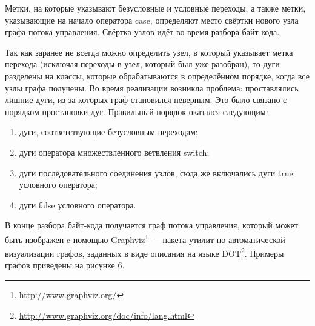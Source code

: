 \documentclass[14pt]{extarticle}
\begin{document}
Метки, на которые указывают безусловные и условные переходы, а также метки, указывающие на начало оператора case, определяют место свёртки нового узла графа потока управления. Свёртка узлов идёт во время разбора байт-кода.

Так как заранее не всегда можно определить узел, в который указывает метка перехода (исключая переходы в узел, который был уже разобран), то дуги разделены на классы, которые обрабатываются в определённом порядке, когда все узлы графа получены. Во время реализации возникла проблема: проставлялись лишние дуги, из-за которых граф становился неверным. Это было связано с порядком простановки дуг. Правильный порядок оказался следующим:
\begin{enumerate}
\item дуги, соответствующие безусловным переходам;
\item дуги оператора множествленного ветвления switch;
\item дуги последовательного соединения узлов, сюда же включались дуги true условного оператора;
\item дуги false условного оператора.
\end{enumerate}

В конце разбора байт-кода получается граф потока управления, который может быть изображен c помощью Graphviz\footnote{\url{http://www.graphviz.org/}} --- пакета утилит по автоматической визуализации графов, заданных в виде описания на языке DOT\footnote{\url{http://www.graphviz.org/doc/info/lang.html}}.
Примеры графов приведены на рисунке 6.
\end{document}

